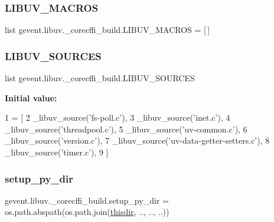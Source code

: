 \subsubsection{\texorpdfstring{L\+I\+B\+U\+V\+\_\+\+M\+A\+C\+R\+OS}{LIBUV\_MACROS}}
{\footnotesize\ttfamily list gevent.\+libuv.\+\_\+corecffi\+\_\+build.\+L\+I\+B\+U\+V\+\_\+\+M\+A\+C\+R\+OS = \mbox{[}$\,$\mbox{]}}

\mbox{\label{namespacegevent_1_1libuv_1_1__corecffi__build_a0419d4ae6f61877c656f35a2537109ce}} 
\subsubsection{\texorpdfstring{L\+I\+B\+U\+V\+\_\+\+S\+O\+U\+R\+C\+ES}{LIBUV\_SOURCES}}
{\footnotesize\ttfamily list gevent.\+libuv.\+\_\+corecffi\+\_\+build.\+L\+I\+B\+U\+V\+\_\+\+S\+O\+U\+R\+C\+ES}

{\bfseries Initial value\+:}
\begin{DoxyCode}
1 =  [
2     \_libuv\_source(\textcolor{stringliteral}{'fs-poll.c'}),
3     \_libuv\_source(\textcolor{stringliteral}{'inet.c'}),
4     \_libuv\_source(\textcolor{stringliteral}{'threadpool.c'}),
5     \_libuv\_source(\textcolor{stringliteral}{'uv-common.c'}),
6     \_libuv\_source(\textcolor{stringliteral}{'version.c'}),
7     \_libuv\_source(\textcolor{stringliteral}{'uv-data-getter-setters.c'}),
8     \_libuv\_source(\textcolor{stringliteral}{'timer.c'}),
9 ]
\end{DoxyCode}
\mbox{\label{namespacegevent_1_1libuv_1_1__corecffi__build_a89415d476f2dadbcfd1af5bf86001bef}} 
\subsubsection{\texorpdfstring{setup\+\_\+py\+\_\+dir}{setup\_py\_dir}}
{\footnotesize\ttfamily gevent.\+libuv.\+\_\+corecffi\+\_\+build.\+setup\+\_\+py\+\_\+dir = os.\+path.\+abspath(os.\+path.\+join(\hyperlink{namespacegevent_1_1libuv_1_1__corecffi__build_ac98ff08f1ed6cc8b007ec1911960c90f}{thisdir}, \textquotesingle{}..\textquotesingle{}, \textquotesingle{}..\textquotesingle{}, \textquotesingle{}..\textquotesingle{}))}

